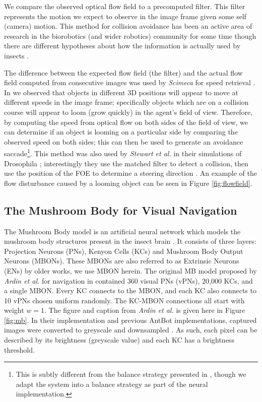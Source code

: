 \documentclass[a4paper,11pt,twoside,openright]{article}
\begin{document}
We compare the observed optical flow field to a precomputed
filter. This filter represents the motion we expect to observe in the
image frame given some self (camera) motion. This method for collision
avoidance has been an active area of research in the biorobotics (and
wider robotics) community for some time though there are different
hypotheses about how the information is actually used by insects
\cite{Julien2017}.\newline\par

The difference between the expected flow field (the filter) and the
actual flow field computed from consecutive images was used by
\textit{Scimeca} for speed retrieval \cite{Scimeca2017}. In
\cite{Mitchell2018} we observed that objects in different 3D positions
will appear to move at different speeds in the image frame;
specifically objects which are on a collision course will appear to
loom (grow quickly) in the agent's field of view. Therefore, by
computing the speed from optical flow on both sides of the field of
view, we can determine if an object is looming on a particular side by
comparing the observed speed on both sides; this can then be used to
generate an avoidance saccade\footnote{This is subtly different from
  the balance strategy presented in \cite{Julien2017}, though we adapt
  the system into a balance strategy as part of the neural
  implementation.}. This method was also used by \textit{Stewart et
  al.} in their simulations of Drosophila \cite{Stewart2010};
interestingly they use the matched filter to detect a collision, then
use the position of the FOE to determine a steering direction
\cite{Stewart2010}. An example of the flow disturbance caused by a
looming object can be seen in Figure \ref{fig:flowfield}.
\newline\par

\subsection{ The Mushroom Body for Visual Navigation } \label{MBBackground}
The Mushroom Body model is an artificial neural network which models
the mushroom body structures present in the insect brain
\cite{Ardin2016}. It consists of three layers: Projection Neurons
(PNs), Kenyon Cells (KCs) and Mushroom Body Output Neurons
(MBONs). These MBONs are also referred to as Extrinsic Neurons (ENs)
by older works, we use MBON herein. The original MB model proposed by
\textit{Ardin et al.} for navigation in \cite{Ardin2016} contained 360
visual PNs (vPNs), 20,000 KCs, and a single MBON. Every KC connects to
the MBON, and each KC also connects to 10 vPNs chosen uniform
randomly. The KC-MBON connections all start with weight $w=1$. The
figure and caption from \textit{Ardin et al.} is given here in Figure
\ref{fig:mb}. In their implementation and previous AntBot
implementations, captured images were converted to greyscale and
downsampled \cite{Ardin2016, Eberding2016, Zhang2017,
  Mitchell2018}. As such, each pixel can be described by its
brightness (greyscale value) and each KC has a brightness threshold.
\newline
\par
\end{document}
